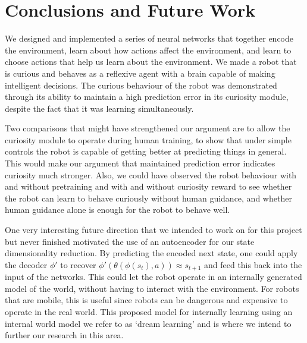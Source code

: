 \documentclass[conference, 12pt]{IEEEtran} %
\begin{document}
	\section{Conclusions and Future Work}
	\par We designed and implemented a series of neural networks that together encode the environment, learn about how actions affect the environment, and learn to choose actions that help us learn about the environment. We made a robot that is curious and behaves as a reflexive agent with a brain capable of making intelligent decisions. The curious behaviour of the robot was demonstrated through its ability to maintain a high prediction error in its curiosity module, despite the fact that it was learning simultaneously.
	\par Two comparisons that might have strengthened our argument are to allow the curiosity module to operate during human training, to show that under simple controls the robot is capable of getting better at predicting things in general. This would make our argument that maintained prediction error indicates curiosity much stronger. Also, we could have observed the robot behaviour with and without pretraining and with and without curiosity reward to see whether the robot can learn to behave curiously without human guidance, and whether human guidance alone is enough for the robot to behave well.
	\par One very interesting future direction that we intended to work on for this project but never finished motivated the use of an autoencoder for our state dimensionality reduction. By predicting the encoded next state, one could apply the decoder $\phi '$ to recover $\phi ' (\theta ( \phi ( s_t), a)) \approx s_{t+1}$ and feed this back into the input of the networks. This could let the robot operate in an internally generated model of the world, without having to interact with the environment. For robots that are mobile, this is useful since robots can be dangerous and expensive to operate in the real world. This proposed model for internally learning using an internal world model we refer to as `dream learning' and is where we intend to further our research in this area.

	
	
\end{document}
